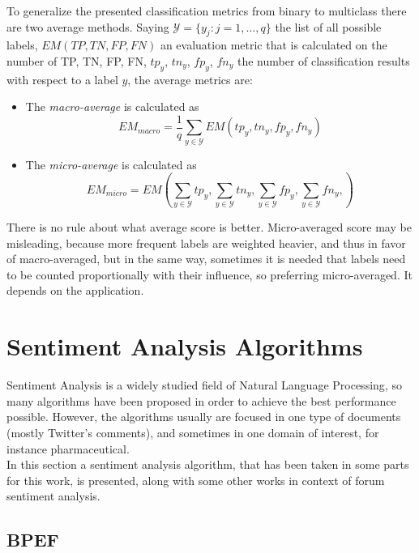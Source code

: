 To generalize the presented classification metrics from binary to multiclass there are two average methods. Saying $\mathcal{Y}=\{y_j : j = 1, \dots, q\}$ the list of all possible labels, $EM(TP, TN, FP, FN)$ an evaluation metric that is calculated on the number of \ac{TP}, \ac{TN}, \ac{FP}, \ac{FN}, $tp_y$, $tn_y$, $fp_y$, $fn_y$ the number of classification results with respect to a label $y$, the average metrics are:

\begin{itemize}
	\item The \textit{macro-average} is calculated as
	\[ EM_{macro} = \frac{1}{q} \sum_{y \in \mathcal{Y}} EM(tp_y, tn_y, fp_y, fn_y) \]
	
	\item The \textit{micro-average} is calculated as
	\[ EM_{micro} = EM \left( \sum_{y \in \mathcal{Y}} tp_y, \sum_{y \in \mathcal{Y}} tn_y, \sum_{y \in \mathcal{Y}} fp_y, \sum_{y \in \mathcal{Y}} fn_y,  \right) \]
\end{itemize}

There is no rule about what average score is better. Micro-averaged score may be misleading, because more frequent labels are weighted heavier, and thus in favor of macro-averaged, but in the same way, sometimes it is needed that labels need to be counted proportionally with their influence, so preferring micro-averaged. It depends on the application.



\section{Sentiment Analysis Algorithms}

Sentiment Analysis is a widely studied field of Natural Language Processing, so many algorithms have been proposed in order to achieve the best performance possible. However, the algorithms usually are focused in one type of documents (mostly Twitter's comments), and sometimes in one domain of interest, for instance pharmaceutical.\\
In this section a sentiment analysis algorithm, that has been taken in some parts for this work, is presented, along with some other works in context of forum sentiment analysis.


\subsection{BPEF}

